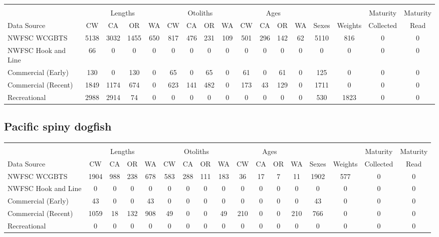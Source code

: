 \documentclass[12pt,]{article}
\begin{document}
\begin{table}[ht]
\centering
\begingroup\fontsize{10pt}{10pt}\selectfont
\begin{tabular}{|l|cccc|cccc|cccc|c|c|c|c|}
  \hline
 &  &  &  &  &  &  &  &  &  &  &  &  &  &  &  &  \\ 
   & \multicolumn{4}{c}{Lengths} &  \multicolumn{4}{c}{Otoliths} & \multicolumn{4}{c}{Ages} &  & & Maturity & Maturity\\
 Data Source & CW & CA & OR & WA & CW & CA & OR & WA & CW & CA & OR & WA & Sexes & Weights & Collected & Read\\
 \hline
NWFSC WCGBTS & 5138 & 3032 & 1455 & 650 & 817 & 476 & 231 & 109 & 501 & 296 & 142 & 62 & 5110 & 816 & 0 & 0 \\ 
  NWFSC Hook and Line & 66 & 0 & 0 & 0 & 0 & 0 & 0 & 0 & 0 & 0 & 0 & 0 & 0 & 0 & 0 & 0 \\ 
  Commercial (Early) & 130 & 0 & 130 & 0 & 65 & 0 & 65 & 0 & 61 & 0 & 61 & 0 & 125 & 0 & 0 & 0 \\ 
  Commercial (Recent) & 1849 & 1174 & 674 & 0 & 623 & 141 & 482 & 0 & 173 & 43 & 129 & 0 & 1711 & 0 & 0 & 0 \\ 
  Recreational & 2988 & 2914 & 74 & 0 & 0 & 0 & 0 & 0 & 0 & 0 & 0 & 0 & 530 & 1823 & 0 & 0 \\ 
   \hline
\end{tabular}
\endgroup
\end{table}

\FloatBarrier  

\newpage  

\subsection{Pacific spiny dogfish}\label{pacific-spiny-dogfish}

\begin{table}[ht]
\centering
\begingroup\fontsize{10pt}{10pt}\selectfont
\begin{tabular}{|l|cccc|cccc|cccc|c|c|c|c|}
  \hline
 &  &  &  &  &  &  &  &  &  &  &  &  &  &  &  &  \\ 
   & \multicolumn{4}{c}{Lengths} &  \multicolumn{4}{c}{Otoliths} & \multicolumn{4}{c}{Ages} &  & & Maturity & Maturity\\
 Data Source & CW & CA & OR & WA & CW & CA & OR & WA & CW & CA & OR & WA & Sexes & Weights & Collected & Read\\
 \hline
NWFSC WCGBTS & 1904 & 988 & 238 & 678 & 583 & 288 & 111 & 183 & 36 & 17 & 7 & 11 & 1902 & 577 & 0 & 0 \\ 
  NWFSC Hook and Line & 0 & 0 & 0 & 0 & 0 & 0 & 0 & 0 & 0 & 0 & 0 & 0 & 0 & 0 & 0 & 0 \\ 
  Commercial (Early) & 43 & 0 & 0 & 43 & 0 & 0 & 0 & 0 & 0 & 0 & 0 & 0 & 43 & 0 & 0 & 0 \\ 
  Commercial (Recent) & 1059 & 18 & 132 & 908 & 49 & 0 & 0 & 49 & 210 & 0 & 0 & 210 & 766 & 0 & 0 & 0 \\ 
  Recreational & 0 & 0 & 0 & 0 & 0 & 0 & 0 & 0 & 0 & 0 & 0 & 0 & 0 & 0 & 0 & 0 \\ 
   \hline
\end{tabular}
\endgroup
\end{table}
\end{document}
